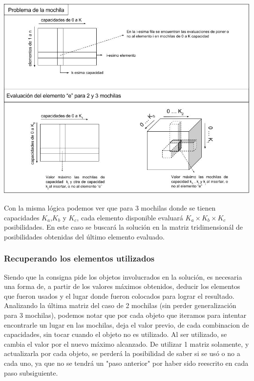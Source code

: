   \vspace*{0.3cm} \vspace*{0.3cm}
  \begin{center}
 \includegraphics[scale=0.6]{./EJ3/dibujo-matrices.jpg}
  \end{center}
  \vspace*{0.3cm}
  
  Con la misma lógica podemos ver que para 3 mochilas donde se tienen capacidades  $K_{a}$,$K_{b}$ y $K_{c}$, cada elemento disponible evaluará $K_{a} \times K_{b} \times K_{c}$ posibilidades. En este caso se buscará la solución en la matriz tridimensionál de posibilidades obtenidas del último elemento evaluado.

\subsubsection*{Recuperando los elementos utilizados}

Siendo que la consigna pide los objetos involucrados en la solución, es necesaria una forma de, a partir de los valores máximos obtenidos, deducir los elementos que fueron usados y el lugar donde fueron colocados para lograr el resultado.\\

Analizando la última matriz del caso de 2 mochilas (sin perder generalización para 3 mochilas), podemos notar que por cada objeto que iteramos para intentar encontrarle un lugar en las mochilas, deja el valor previo, de cada combinacion de capacidades, sin tocar cuando el objeto no es utilizado. Al ser utilizado, se cambia el valor por el nuevo máximo alcanzado. De utilizar 1 matriz solamente, y actualizarla por cada objeto, se perderá la posibilidad de saber si se usó o no a cada uno, ya que no se tendrá un "paso anterior" por haber sido reescrito en cada paso subsiguiente. \\

